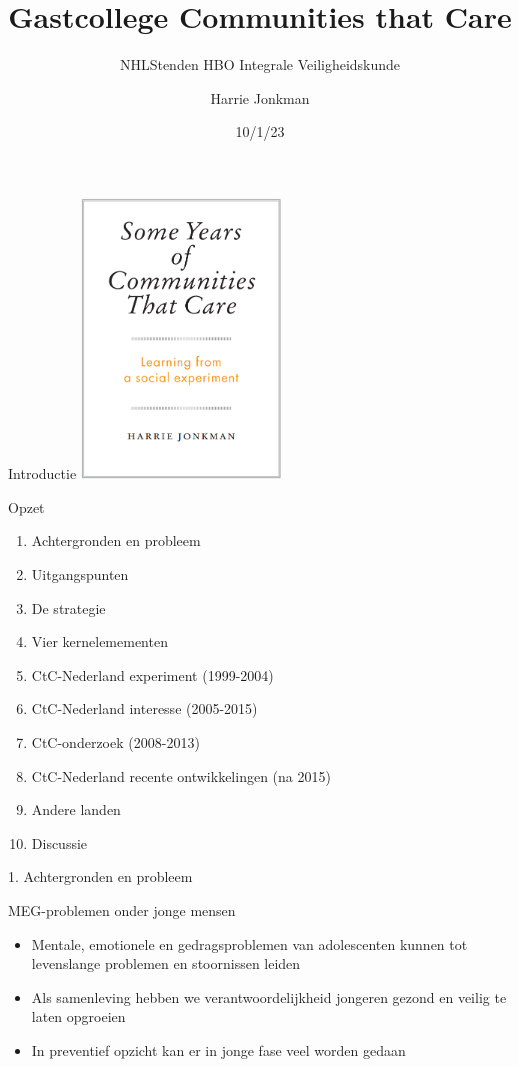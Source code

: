\documentclass[
  ignorenonframetext,
]{beamer}
\title{Gastcollege Communities that Care}
\subtitle{NHLStenden HBO Integrale Veiligheidskunde}
\author{Harrie Jonkman}
\date{10/1/23}
\providecommand{\tightlist}{%
  \setlength{\itemsep}{0pt}\setlength{\parskip}{0pt}}\usepackage{longtable,booktabs,array}
\begin{document}
\frame{\titlepage}
\ifdefined\Shaded\renewenvironment{Shaded}{\begin{tcolorbox}[boxrule=0pt, breakable, borderline west={3pt}{0pt}{shadecolor}, interior hidden, enhanced, frame hidden, sharp corners]}{\end{tcolorbox}}\fi

\begin{frame}{Introductie}
\protect\hypertarget{introductie}{}
\includegraphics[width=2.08333in,height=\textheight]{images/CtC_voorkant.png}
\end{frame}

\begin{frame}{Opzet}
\protect\hypertarget{opzet}{}
\begin{enumerate}
\tightlist
\item
  Achtergronden en probleem
\item
  Uitgangspunten
\item
  De strategie
\item
  Vier kernelemementen
\item
  CtC-Nederland experiment (1999-2004)
\item
  CtC-Nederland interesse (2005-2015)
\item
  CtC-onderzoek (2008-2013)
\item
  CtC-Nederland recente ontwikkelingen (na 2015)
\item
  Andere landen
\item
  Discussie
\end{enumerate}
\end{frame}

\begin{frame}{1. Achtergronden en probleem}
\protect\hypertarget{achtergronden-en-probleem}{}
\end{frame}

\begin{frame}{MEG-problemen onder jonge mensen}
\protect\hypertarget{meg-problemen-onder-jonge-mensen}{}
\begin{itemize}
\tightlist
\item
  Mentale, emotionele en gedragsproblemen van adolescenten kunnen tot
  levenslange problemen en stoornissen leiden
\item
  Als samenleving hebben we verantwoordelijkheid jongeren gezond en
  veilig te laten opgroeien
\item
  In preventief opzicht kan er in jonge fase veel worden gedaan
\end{itemize}
\end{frame}
\end{document}
